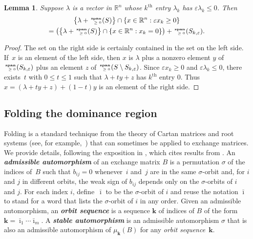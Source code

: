 \documentclass{amsart}
\newtheorem{lemma}[proposition]{Lemma}
\theoremstyle{definition}
\theoremstyle{remark}
\numberwithin{equation}{section}
\newcommand{\newword}[1]{\textbf{\emph{#1}}}
\newcommand{\reals}{\mathbb R}
\newcommand{\ep}{\varepsilon}
\newcommand{\sgn}{\operatorname{sgn}}
\newcommand{\nnspan}{{\!\!\tiny\begin{array}{r}\mathbf{span}\\\ge0\end{array}\hspace*{-0.57em}}}
\newcommand{\set}[1]{{\lbrace #1 \rbrace}}
\newcommand{\sett}[1]{{\bigl\lbrace #1 \bigr\rbrace}}
\renewcommand{\th}{^\text{th}}
\newcommand{\0}{{\mathbf{0}}}
\newcommand{\kk}{{\boldsymbol{k}}}
\renewcommand{\th}{^\text{th}}
\begin{document}
\begin{lemma}\label{ps lemma}
Suppose $\lambda$ is a vector in $\reals^n$ whose $k\th$ entry $\lambda_k$ has $\ep\lambda_k\le0$.
Then %
\begin{multline*}
\sett{\lambda+\nnspan(S)}\cap\set{x\in\reals^n:\ep x_k\ge0}\\
=\bigl(\sett{\lambda+\nnspan(S)}\cap\set{x\in\reals^n:x_k=0}\bigr)+\nnspan(S_{k,\ep}).
\end{multline*}
\end{lemma}
\begin{proof}
The set on the right side is certainly contained in the set on the left side.
If~$x$ is an element of the left side, then $x$ is $\lambda$ plus a nonzero element $y$ of $\nnspan(S_{k,\ep})$ plus an element $z$ of $\nnspan(S\setminus S_{k,\ep})$.
Since $\ep x_k\ge0$ and $\ep\lambda_k\le0$, there exists~$t$ with ${0\le t\le1}$ such that $\lambda+ty+z$ has $k\th$ entry $0$.
Thus ${x=(\lambda+ty+z)+(1-t)y}$ is an element of the right side.
\end{proof}

\subsection{Folding the dominance region}\label{fold sec}
Folding is a standard technique from the theory of Cartan matrices and root systems (see, for example,~\cite{StembridgeFolding}) that can sometimes be applied to exchange matrices.
We provide details, following the exposition in \cite[Sections~2.3--2.4]{VielThesis}, which cites results from \cite{CaoHuangLi,DemonetThesis,DupontNonSimp,NS14}.
An \newword{admissible automorphism} of an exchange matrix $B$ is a permutation $\sigma$ of the indices of~$B$ such that $b_{ij}=0$ whenever~$i$ and~$j$ are in the same $\sigma$-orbit and, for $i$ and $j$ in different orbits, the weak sign of $b_{ij}$ depends only on the $\sigma$-orbits of $i$ and $j$.
For each index $i$, define~$\bar\imath$ to be the $\sigma$-orbit of $i$ and reuse the notation $\bar\imath$ to stand for a word that lists the $\sigma$-orbit of $i$ in any order.
Given an admissible automorphism, an \newword{orbit sequence} is a sequence $\kk$ of indices of $B$ of the form $\kk=\bar\imath_1\cdots\bar\imath_m$.
A \newword{stable automorphism} is an admissible automorphism $\sigma$ that is also an admissible automorphism of $\mu_\kk(B)$ for any \emph{orbit sequence}~$\kk$.
\end{document}
